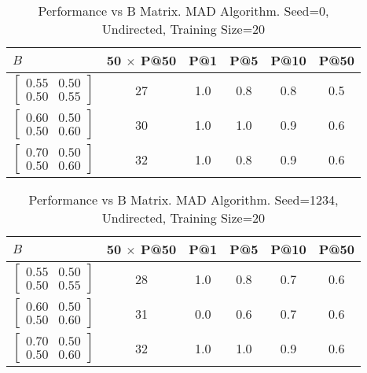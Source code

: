 \documentclass{tufte-handout}
\begin{document}
\begin{table}[htbp]
  \begin{tabular}{l c c c c c}
    $B$ & 50 $\times$ P@50 & P@1 & P@5 & P@10 & P@50 \\ \toprule
  $\begin{bmatrix} 0.55 & 0.50 \\0.50 &0.55 \end{bmatrix}$ & 27 & 1.0 & 0.8 & 0.8 & 0.5 \\
  $\begin{bmatrix} 0.60 & 0.50 \\0.50 &0.60 \end{bmatrix}$ & 30 & 1.0 & 1.0 & 0.9 & 0.6 \\
  $\begin{bmatrix} 0.70 & 0.50 \\0.50 &0.60 \end{bmatrix}$ & 32 & 1.0 & 0.8 & 0.9 & 0.6 \\
  \end{tabular}
  \caption{Performance vs B Matrix. MAD Algorithm. Seed=0, Undirected, Training Size=20}
  \label{tab:perf-vs-b}
\end{table}

\begin{table}[!htbp]
  \begin{tabular}{l c c c c c}
    $B$ & 50 $\times$ P@50 & P@1 & P@5 & P@10 & P@50 \\ \toprule
  $\begin{bmatrix} 0.55 & 0.50 \\0.50 &0.55 \end{bmatrix}$ & 28 & 1.0 & 0.8 & 0.7 & 0.6 \\
  $\begin{bmatrix} 0.60 & 0.50 \\0.50 &0.60 \end{bmatrix}$ & 31 & 0.0 & 0.6 & 0.7 & 0.6 \\
  $\begin{bmatrix} 0.70 & 0.50 \\0.50 &0.60 \end{bmatrix}$ & 32 & 1.0 & 1.0 & 0.9 & 0.6 \\
  \end{tabular}
  \caption{Performance vs B Matrix. MAD Algorithm. Seed=1234, Undirected, Training Size=20}
  \label{tab:perf-vs-b}
\end{table}

\pagebreak
\end{document}
